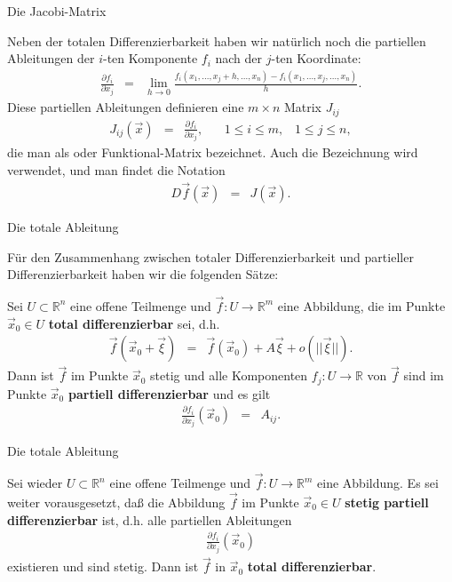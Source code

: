 \documentclass[german]{beamer}
\newcommand{\bq}{\begin{eqnarray*}}
\newcommand{\eq}{\end{eqnarray*}}
\newcommand{\superalert}[1]{{\color{MyYellowOrange}{#1}}}
\begin{document}
\begin{frame}{Die Jacobi-Matrix}

Neben der totalen Differenzierbarkeit haben wir nat\"urlich noch die partiellen Ableitungen der $i$-ten Komponente $f_i$ nach
der $j$-ten Koordinate:
\bq
 \frac{\partial f_i}{\partial x_j} & = & 
 \lim\limits_{h \rightarrow 0} \frac{f_i\left(x_1,...,x_j+h,...,x_n\right)-f_i\left(x_1,...,x_j,...,x_n\right)}{h}.
\eq
Diese partiellen Ableitungen definieren eine $m \times n$ Matrix $J_{ij}$
\bq
 J_{ij}\left(\vec{x}\right) & = & \frac{\partial f_i}{\partial x_j},
 \;\;\;\;\;\;
 1 \le i \le m,
 \;\;\;
 1 \le j \le n,
\eq
die man als \superalert{Jacobi-Matrix} oder Funktional-Matrix bezeichnet.
Auch die Bezeichnung \superalert{Differential} wird verwendet, und man findet die Notation
\bq
 D\vec{f}\left(\vec{x}\right) & = & J\left(\vec{x}\right).
\eq

\end{frame}

\begin{frame}{Die totale Ableitung}

F\"ur den Zusammenhang zwischen totaler Differenzierbarkeit und partieller Differenzierbarkeit haben wir die
folgenden S\"atze:

\begin{theorem}
Sei $U \subset {\mathbb R}^n$ eine offene Teilmenge und $\vec{f} : U \rightarrow {\mathbb R}^m$ eine Abbildung,
die im Punkte $\vec{x}_0 \in U$ {\bf total differenzierbar} sei, d.h.
\bq
 \vec{f}\left(\vec{x}_0+\vec{\xi}\right) & = & 
 \vec{f}\left(\vec{x}_0\right)
 + A \vec{\xi}
 + o\left(||\vec{\xi}||\right).
\eq
Dann ist $\vec{f}$ im Punkte $\vec{x}_0$ stetig und alle Komponenten $f_j : U \rightarrow {\mathbb R}$ von $\vec{f}$
sind im Punkte $\vec{x}_0$ {\bf partiell differenzierbar} und es gilt
\bq
 \frac{\partial f_i}{\partial x_j}\left( \vec{x}_0 \right)
 & = & A_{ij}.
\eq
\end{theorem}

\end{frame}

\begin{frame}{Die totale Ableitung}

\begin{theorem}
Sei wieder $U \subset {\mathbb R}^n$ eine offene Teilmenge und $\vec{f} : U \rightarrow {\mathbb R}^m$ eine Abbildung.
Es sei weiter vorausgesetzt, da{\ss} die Abbildung $\vec{f}$ im Punkte $\vec{x}_0 \in U$ {\bf stetig partiell differenzierbar} ist,
d.h. alle partiellen Ableitungen 
\bq
\frac{\partial f_i}{\partial x_j}\left(\vec{x}_0\right)
\eq
existieren und sind stetig.
Dann ist $\vec{f}$ in $\vec{x}_0$ {\bf total differenzierbar}.
\end{theorem}

\end{frame}
\end{document}
